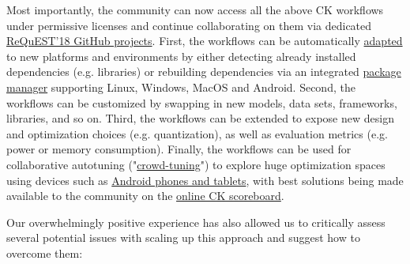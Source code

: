 \documentclass[10pt,onecolumn]{article}
\begin{document}
Most importantly, the community can now access all the above
CK workflows under permissive licenses and continue
collaborating on them via dedicated 
\href{https://github.com/ctuning/ck-request-asplos18-results}{ReQuEST'18 GitHub projects}. 
First, the workflows can be automatically \href{https://github.com/ctuning/ck/wiki/Portable-workflows}{adapted}
to new platforms and environments by either detecting already
installed dependencies (e.g. libraries) or rebuilding
dependencies via an integrated \href{http://cKnowledge.org/shared-packages.html}{package manager} supporting
Linux, Windows, MacOS and Android. Second, the workflows can
be customized by swapping in new models, data sets,
frameworks, libraries, and so on. Third, the workflows can be
extended to expose new design and optimization choices (e.g.
quantization), as well as evaluation metrics (e.g. power
or memory consumption). Finally, the workflows can be used for
collaborative autotuning ("\href{http://cKnowledge.org/rpi-crowd-tuning}{crowd-tuning}") 
to explore huge optimization spaces using devices such as 
\href{https://play.google.com/store/apps/details?id=openscience.crowdsource.video.experiments}{Android phones and tablets}, 
with best solutions being made available to the
community on the \href{http://cKnowledge.org/dnn-crowd-benchmarking-results}{online CK scoreboard}.

Our overwhelmingly positive experience has also allowed us to
critically assess several potential issues with scaling
up this approach and suggest how to overcome them:
\end{document}

